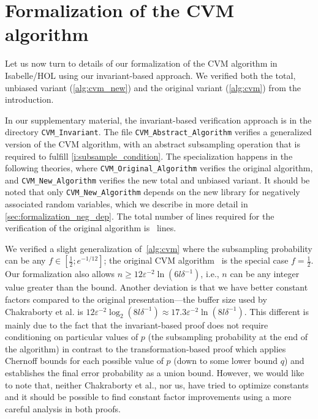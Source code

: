 \section{Formalization of the CVM algorithm}\label{sec:formalization}
Let us now turn to details of our formalization of the CVM algorithm in Isabelle/HOL using our invariant-based approach.
We verified both the total, unbiased variant (\cref{alg:cvm_new}) and the original variant (\cref{alg:cvm}) from the introduction.

\begin{note}
In our supplementary material, the invariant-based verification approach is in the directory \verb|CVM_Invariant|.
The file \verb|CVM_Abstract_Algorithm| verifies a generalized version of the CVM algorithm, with an abstract subsampling operation that is required to fulfill \cref{i:subsample_condition}.
The specialization happens in the following theories, where \verb|CVM_Original_Algorithm| verifies the original algorithm, and \verb|CVM_New_Algorithm| verifies the new total and unbiased variant.
It should be noted that only \verb|CVM_New_Algorithm| depends on the new library for negatively associated random variables, which we describe in more detail in \cref{sec:formalization_neg_dep}.
The total number of lines required for the verification of the original algorithm is \locnew~lines.
\lipicsEnd\end{note}

We verified a slight generalization of~\cref{alg:cvm} where the subsampling probability can be any $f \in [\frac{1}{2};e^{-1/12}]$; the original CVM algorithm~\cite{chakraborty2022} is the special case $f=\frac{1}{2}$.
Our formalization also allows $n \geq 12 \varepsilon^{-2} \ln(6 l \delta^{-1})$, i.e., $n$ can be any integer value greater than the bound.
Another deviation is that we have better constant factors compared to the original presentation---the buffer size used by Chakraborty et al. is $12 \varepsilon^{-2} \log_2(8 l \delta^{-1}) \approx 17.3 \varepsilon^{-2} \ln(8 l \delta^{-1})$.
This different is mainly due to the fact that the invariant-based proof does not require conditioning on particular values of $p$ (the subsampling probability at the end of the algorithm) in contrast to the transformation-based proof which applies Chernoff bounds for each possible value of $p$ (down to some lower bound $q$) and establishes the final error probability as a union bound.
However, we would like to note that, neither Chakraborty et al., nor us, have tried to optimize constants and it should be possible to find constant factor improvements using a more careful analysis in both proofs.

